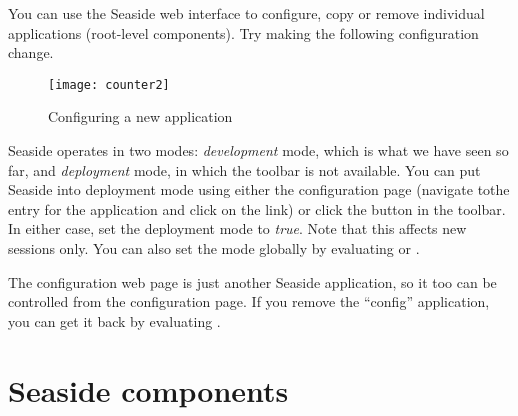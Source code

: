 \documentclass[a4paper,10pt,twoside]{book}
\begin{document}
You can use the Seaside web interface to configure, copy or remove individual
applications (\ie root-level components). Try making the following configuration change.



\begin{figure}[ht]
\begin{center}
\texttt{[image: counter2]}
\caption{Configuring a new application}
\end{center}
\end{figure}

Seaside operates in two modes: \emph{development} mode, which is what we have seen so
far, and \emph{deployment} mode, in which the toolbar is not available.
You can put Seaside into deployment mode using either the configuration page (navigate tothe entry for the application and click on the  link)
or click the  button in the toolbar.
In either case, set the deployment mode to \emph{true}.
Note that this affects new sessions only.
You can also set the mode globally by evaluating
 
or
.

The configuration web page is just another Seaside application, so it too can be
controlled from the configuration page.
If you remove the ``config'' application, you can get it back by evaluating
 .

\section{Seaside components}
\end{document}
